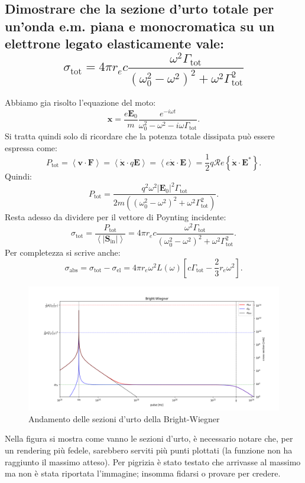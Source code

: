 \subsection[\hspace{2mm} Sezione d'urto totale per onda piana su elettrone legato elasticamente]{Dimostrare che la sezione d’urto totale per un’onda e.m. piana e monocromatica su un elettrone legato elasticamente vale:
\[
	\sigma_{\text{tot}} = 4 \pi r_{e} c \frac{\omega^2 \Gamma_{\text{tot}}}{\left( \omega_0^2-\omega^2 \right)^2+\omega^2\Gamma_{\text{tot}}^2}
\] 
}
Abbiamo gia risolto l'equazione del moto:
\[
\boldsymbol{x}= \frac{e \boldsymbol{E}_0}{m} \frac{e^{- i \omega t}}{\omega _0^2 - \omega ^2 - i \omega \Gamma_{\text{tot}}}
.\] 
Si tratta quindi solo di ricordare che la potenza totale dissipata può essere espressa come:
\[
	P_{\text{tot}} = \left<\boldsymbol{v} \cdot \boldsymbol{F} \right> = \left<\dot{\boldsymbol{x}}\cdot q \boldsymbol{E} \right> = \left< e \dot{\boldsymbol{x}} \cdot \boldsymbol{E} \right> = \frac{1}{2} q \mathcal{R}e \left\{ \dot{\boldsymbol{x}} \cdot \boldsymbol{E}^* \right\} 
.\]
Quindi:
\[
	P_{\text{tot}} = \frac{q^2 \omega ^2 \left| \boldsymbol{E}_0 \right|^2 \Gamma_{\text{tot}}}{2m\left( \left(\omega _0^2 - \omega ^2 \right) ^2 + \omega ^2 \Gamma_{\text{tot}}^2  \right) }
.\] 
Resta adesso da dividere per il vettore di Poynting incidente:
\[
\sigma_{\text{tot}} = \frac{P_{\text{tot}}}{\left<\left| \boldsymbol{S}_{\text{in}} \right|\right>} = 4 \pi r_{e} c \frac{\omega^2 \Gamma_{\text{tot}}}{\left( \omega_0^2-\omega^2 \right)^2+\omega^2\Gamma_{\text{tot}}^2}
.\] 
Per completezza si scrive anche:
\[
\sigma_{\text{abs}} = \sigma_{\text{tot}} - \sigma_{\text{el}} = 4 \pi r_{e} \omega^2 L\left( \omega \right) \left[ c \Gamma_{\text{tot}} - \frac{2}{3}r_e \omega^2 \right]
.\] 
\begin{figure}[H]
	\centering
	\includegraphics[width=1.1\textwidth]{immagini/b-w.png}
	\caption{Andamento delle sezioni d'urto della Bright-Wiegner}
	\label{fig:Andamento Bright-Wiegner}
\end{figure}
Nella figura si mostra come vanno le sezioni d'urto, è necessario notare che, per un rendering più fedele, sarebbero serviti più punti plottati (la funzione non ha raggiunto il massimo atteso). Per pigrizia è stato testato che arrivasse al massimo ma non è stata riportata l'immagine; insomma fidarsi o provare per credere.

